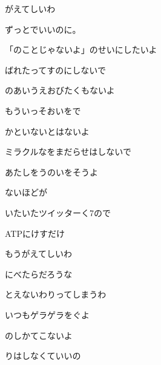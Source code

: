 \documentclass[a4paper,tate,twocolumn,12pt]{ltjtarticle}
\begin{document}
\thispagestyle{empty}

\begin{center}
{\LARGE {}がえてしいわ}

{\large ずっとでいいのに。}
\end{center}

\vspace{1em}

\begin{flushleft}

\noindent\begin{minipage}{\linewidth}
「のことじゃないよ」のせいにしたいよ

ばれたってすのにしないで

のあいうえおびたくもないよ

もういっそおいをで

かといないとはないよ

ミラクルなをまだらせはしないで

あたしをうのいをそうよ

ないほどが

いたいたツイッターく7ので

ATPにけすだけ
\end{minipage}

\vspace{2em}

\noindent\begin{minipage}{\linewidth}
もうがえてしいわ

にべたらだろうな

とえないわりってしまうわ

いつもゲラゲラをぐよ

のしかてこないよ

りはしなくていいの


\end{minipage}
\end{flushleft}
\end{document}

